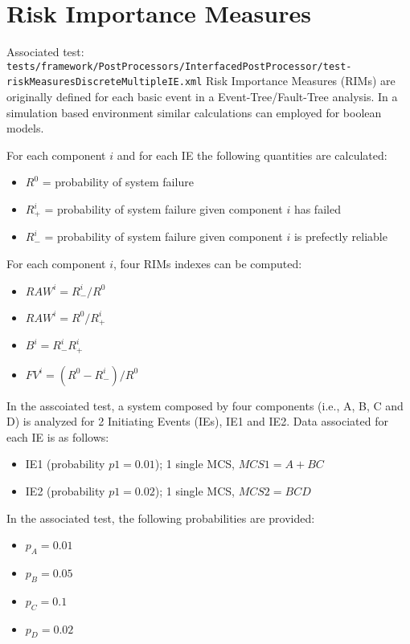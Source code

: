 \section{Risk Importance Measures}
Associated test: \texttt{tests/framework/PostProcessors/InterfacedPostProcessor/test-riskMeasuresDiscreteMultipleIE.xml} 
Risk Importance Measures (RIMs) are originally defined for each basic event in a Event-Tree/Fault-Tree analysis.
In a simulation based environment similar calculations can employed for boolean models.

For each component $i$ and for each IE the following quantities are calculated:
\begin{itemize}
  \item $R^0$ = probability of system failure
  \item $R^i_+$ = probability of system failure given component $i$ has failed
  \item $R^i_-$ = probability of system failure given component $i$ is prefectly reliable
\end{itemize}

For each component $i$, four RIMs indexes can be computed:
\begin{itemize}
  \item $RAW^i = R^i_-/R^0$
  \item $RAW^i = R^0/R^i_+$
  \item $B^i = R^i_- R^i_+$
  \item $FV^i = (R^0 -  R^i_-)/R^0$
\end{itemize}

In the asscoiated test, a system composed by four components (i.e., A, B, C and D) is analyzed for 2 Initiating Events (IEs), IE1 and IE2.
Data associated for each IE is as follows:
\begin{itemize}
  \item IE1 (probability $p1=0.01$); 1 single MCS, $MCS1 = A+BC$
  \item IE2 (probability $p1=0.02$); 1 single MCS, $MCS2 = BCD$
\end{itemize} 

In the associated test, the following probabilities are provided:
\begin{itemize}
  \item $p_A = 0.01$
  \item $p_B = 0.05$
  \item $p_C = 0.1 $
  \item $p_D = 0.02$
\end{itemize}


